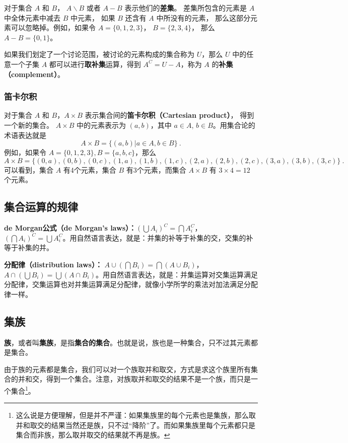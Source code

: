 对于集合 $A$ 和 $B$， $A\backslash B$ 或者 $A-B$ 表示他们的\textbf{差集}。 差集所包含的元素是 $A$ 中全体元素中减去 $B$ 中元素， 如果 $B$ 还含有 $A$ 中所没有的元素， 那么这部分元素可以忽略掉。例如，如果令 $A=\{0,1,2,3\}$， $B=\{2,3,4\}$， 那么 $A-B=\{0,1\}$。

如果我们划定了一个讨论范围，被讨论的元素构成的集合称为 $U$，那么 $U$ 中的任意一个子集 $A$ 都可以进行\textbf{取补集}运算，得到 $A^C=U-A$，称为 $A$ 的\textbf{补集（complement）}。

\subsubsection{笛卡尔积}
对于集合 $A$ 和 $B$，$A\times B$ 表示集合间的\textbf{笛卡尔积（Cartesian product）}， 得到一个新的集合。 $A\times B$ 中的元素表示为 $(a,b)$，其中 $a\in A$, $b\in B$。用集合论的术语表达就是
\begin{equation}\label{eq_Set_1}
A\times B=\{(a,b)|a\in A, b\in B\}~.
\end{equation}
例如，如果令 $A=\{0,1,2,3\}, B=\{a, b, c\}$，那么
\begin{equation}
A\times B=\{ (0,a),(0,b),(0,c),(1,a),(1,b),(1,c),(2,a),(2,b),(2,c),(3,a),(3,b),(3,c) \}~.
\end{equation}
可以看到，集合 $A$ 有4个元素，集合 $B$ 有3个元素，而集合 $A\times B$ 有 $3\times4 = 12$ 个元素。

\subsection{集合运算的规律}

\textbf{de Morgan公式（de Morgan's laws）：}$(\bigcup A_i)^C=\bigcap A_i^C$，$(\bigcap A_i)^C=\bigcup A_i^C$。用自然语言表达，就是：并集的补等于补集的交，交集的补等于补集的并。

\textbf{分配律（distribution laws）：} $A\cup(\bigcap B_i)=\bigcap (A\cup B_i)$，$A\cap(\bigcup B_i)=\bigcup (A\cap B_i)$。用自然语言表达，就是：并集运算对交集运算满足分配律，交集运算也对并集运算满足分配律，就像小学所学的乘法对加法满足分配律一样。


\subsection{集族}

\textbf{族}，或者叫\textbf{集族}，是指\textbf{集合的集合}。也就是说，族也是一种集合，只不过其元素都是集合。

由于族的元素都是集合，我们可以对一个族取并和取交，方式是求这个族里所有集合的并和交，得到一个集合。注意，对族取并和取交的结果不是一个族，而只是一个集合\footnote{这么说是方便理解，但是并不严谨：如果集族里的每个元素也是集族，那么取并和取交的结果当然还是族，只不过“降阶”了。而如果集族里每个元素都只是集合而非族，那么取并取交的结果就不再是族。}。

